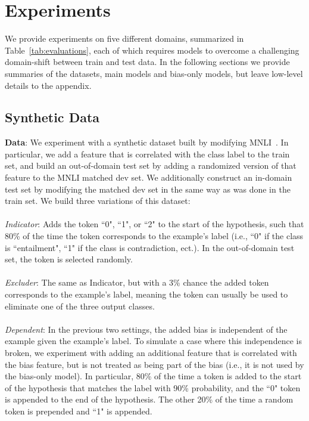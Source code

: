 \documentclass[11pt,a4paper]{article}
\begin{document}
 
\section{Experiments}
\newcommand{\resultheader}[1]{~\\\noindent\textbf{#1}:}
\newcommand{\resultheaderns}[1]{\noindent\textbf{#1}:}
We provide experiments on five different domains, summarized in Table~\ref{tab:evaluations}, each of which requires models to overcome a challenging domain-shift between train and test data.
In the following sections we provide summaries of the datasets, main models and bias-only models, but leave low-level details to the appendix. 

\subsection{Synthetic Data}
\label{sect:synthetic}
\resultheaderns{Data} We experiment with a synthetic dataset built by modifying  MNLI~\cite{bowman2015large}. In particular, we add a feature that is correlated with the class label to the train set, and build an out-of-domain test set by adding a randomized version of that feature to the MNLI matched dev set. We additionally construct an in-domain test set by modifying the matched dev set in the same way as was done in the train set. We build three variations of this dataset:
\\
\\  
\textit{Indicator}: Adds the token ``0", ``1", or ``2" to the start of the hypothesis, such that 80\% of the time the token corresponds to the example's label (i.e., ``0" if the class is ``entailment", ``1" if the class is contradiction, ect.). In the out-of-domain test set, the token is selected randomly.
\\
\\
\textit{Excluder}: The same as Indicator, but with a 3\% chance the added token corresponds to the example's label, meaning the token can usually be used to eliminate one of the three output classes.
\\
\\
\textit{Dependent}: In the previous two settings, the added bias is independent of the example given the example's label. To simulate a case where this independence is broken, we experiment with adding an additional feature that is correlated with the bias feature, but is not treated as being part of the bias (i.e., it is not used by the bias-only model).
In particular, 80\% of the time a token is added to the start of the hypothesis that matches the label with 90\% probability, and the ``0" token is appended to the end of the hypothesis. The other 20\% of the time a random token is prepended and ``1" is appended. 
\end{document}
